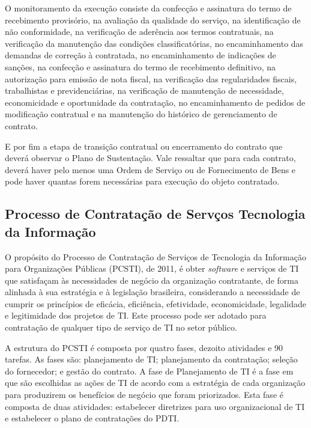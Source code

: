 O monitoramento da execução consiste da confecção e assinatura do termo de recebimento provisório, na avaliação da qualidade do serviço, na identificação de não conformidade, na verificação de aderência aos termos contratuais, na verificação da manutenção das condições classificatórias, no encaminhamento das demandas de correção à contratada, no encaminhamento de indicações de sanções, na confecção e assinatura do termo de recebimento definitivo, na autorização para emissão de nota fiscal, na verificação das regularidades fiscais, trabalhistas e previdenciárias, na verificação de manutenção de necessidade, economicidade e oportunidade da contratação, no encaminhamento de pedidos de modificação contratual e na manutenção do histórico de gerenciamento de contrato. 

E por fim a etapa de transição contratual ou encerramento do contrato que deverá observar o Plano de Sustentação. Vale ressaltar que para cada contrato, deverá haver pelo menos uma Ordem de Serviço ou de Fornecimento de Bens e pode haver quantas forem necessárias para execução do objeto contratado.


\subsection[Processo de Contratação de Serviços Tecnologia da Informação]{Processo de Contratação de Servços Tecnologia da Informação}

O propósito do Processo de Contratação de Serviços de Tecnologia da Informação para Organizações Públicas (PCSTI), de 2011, é obter \textit{software} e serviços de TI que satisfaçam às necessidades de negócio da organização contratante, de forma alinhada à sua estratégia e à legislação brasileira, considerando a necessidade de cumprir os princípios de eficácia, eficiência, efetividade, economicidade, legalidade e legitimidade dos projetos de TI. Este processo pode ser adotado para contratação de qualquer tipo de serviço de TI no setor público.

A estrutura do PCSTI é composta por quatro fases, dezoito atividades e 90 tarefas. As fases são: planejamento de TI; planejamento da contratação; seleção do fornecedor; e gestão do contrato.  A fase de Planejamento de TI é a fase em que são escolhidas as ações de TI de acordo com a estratégia de cada organização para produzirem os benefícios de negócio que foram priorizados. Esta fase é composta de duas atividades: estabelecer diretrizes para uso organizacional de TI e estabelecer o plano de contratações do PDTI.

